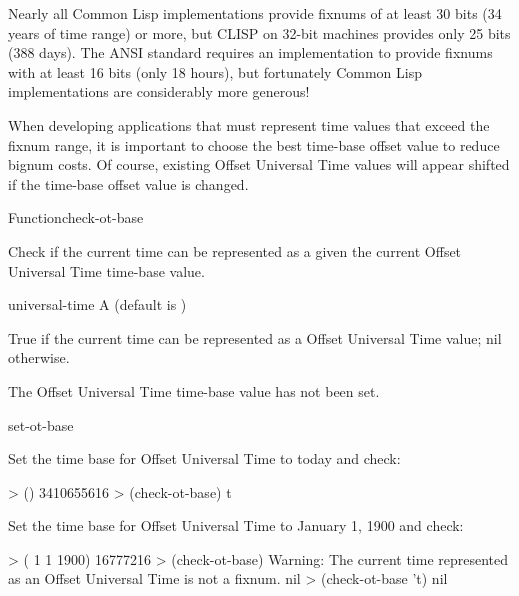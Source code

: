\documentclass[10pt,twoside,english,pdftex]{article}
\begin{document}
Nearly all Common Lisp implementations provide fixnums of at least 30
bits (34 years of time range) or more, but CLISP on 32-bit machines
provides only 25 bits (388 days).  The ANSI standard requires an
implementation to provide fixnums with at least 16 bits (only 18
hours), but fortunately Common Lisp implementations are considerably more
generous!

When developing applications that must represent time values that
exceed the fixnum range, it is important to choose the best time-base
offset value to reduce bignum costs.  Of course, existing Offset
Universal Time values will appear shifted if the time-base offset
value is changed.

\W\entities
\T\clearpage


\begin{functiondoc}{Function}{check-ot-base}{
    \returns{} }

%

\fnsyntax

\fnpurpose Check if the current time can be represented as a 
given the current Offset Universal Time time-base value.

\fnpackage {}

\fnmodule {}

\fnargs
\begin{args}{universal-time}
 A  (default is \nil)
\end{args}

\fnreturns True if the current time can be represented as a 
Offset Universal Time value; nil otherwise.

\fnerrors The Offset Universal Time time-base value has not been set.

\begin{alsos}{set-ot-base}
\also[ot2ut]
\also[ut2ot]
\end{alsos}

\fnexamples
Set the time base for Offset Universal Time to today and check:
\begin{example}
> ()
3410655616
> (check-ot-base)
t
\end{example}
Set the time base for Offset Universal Time to January 1, 1900 and check:
\begin{example}
> ( 1 1 1900)
16777216
> (check-ot-base)
Warning: The current time represented as an Offset Universal Time is not a fixnum.
nil
> (check-ot-base 't)
nil
\end{example}

\end{functiondoc}
\end{document}
